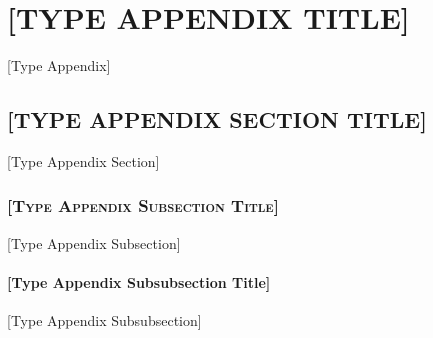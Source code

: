 \chapter{\MakeUppercase{[Type Appendix Title]}}
[Type Appendix]
\section{\MakeUppercase{[Type Appendix Section Title]}}
[Type Appendix Section]
\subsection{\textsc{[Type Appendix Subsection Title]}}
[Type Appendix Subsection]
\subsubsection{[Type Appendix Subsubsection Title]}
[Type Appendix Subsubsection]